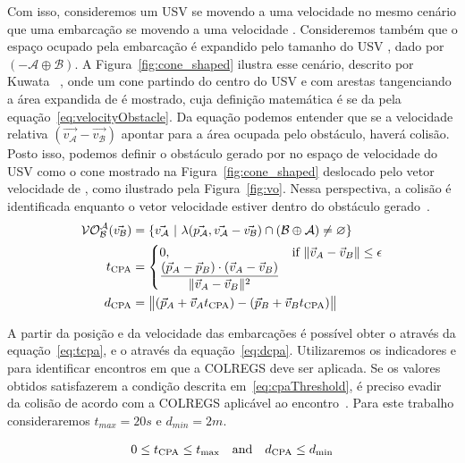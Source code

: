         Com isso, consideremos um USV \A se movendo a uma velocidade \va no mesmo cenário que uma embarcação \B se movendo a uma velocidade \vb. Consideremos também que o espaço ocupado pela embarcação \B é expandido pelo tamanho do USV \A, dado por $(-\mathcal{A} \oplus \mathcal{B})$. A Figura~\ref{fig:cone_shaped} ilustra esse cenário, descrito por Kuwata \etal~\cite{KUWATA2014110}, onde um cone partindo do centro do USV \A e com arestas tangenciando a área expandida de \B é mostrado, cuja definição matemática é se da pela equação~\eqref{eq:velocityObstacle}. Da equação podemos entender que se a velocidade relativa $(\vec{v_\mathcal{A}} - \vec{v_\mathcal{B}})$ apontar para a área ocupada pelo obstáculo, haverá colisão. Posto isso, podemos definir o obstáculo gerado por \B no espaço de velocidade do USV \A como o cone mostrado na Figura~\ref{fig:cone_shaped} deslocado pelo vetor velocidade de \vb, como ilustrado pela Figura~\ref{fig:vo}. Nessa perspectiva, a colisão é identificada enquanto o vetor velocidade \va estiver dentro do obstáculo gerado~\cite{KUWATA2014110}.
        \begin{align}
            \mathcal{VO^A_B}(\vec{v_\mathcal{B}}) &= \{\vec{v_\mathcal{A}}~|~\lambda(\vec{p_\mathcal{A}}, \vec{v_\mathcal{A}} - \vec{v_\mathcal{B}}) \cap (\mathcal{B} \oplus \mathcal{A}) \neq \varnothing\}\label{eq:velocityObstacle}\\
            t_{\rm CPA} &=
            \begin{cases}
                0, & \text{if } \Vert\vec{v}_{A}-\vec{v}_{B}\Vert\leq\epsilon\\
                \displaystyle{{(\vec{p}_{A}-\vec{p}_{B})\cdot(\vec{v}_{A}-\vec{v}_{B})}\over{\Vert\vec{v}_{A}-\vec{v}_{B}\Vert^{2}}}
            \end{cases}\label{eq:tcpa}\\
            d_{\rm CPA} &=\bigl\Vert (\vec{p}_{A}+\vec{v}_{A}t_{\rm CPA})-(\vec{p}_{B}+\vec{v}_{B}t_{\rm CPA})\bigr\Vert\label{eq:dcpa}
        \end{align}
        
        A partir da posição \pos e da velocidade \vel das embarcações é possível obter o \tcpa através da equação~\eqref{eq:tcpa}, e o \dcpa através da equação~\eqref{eq:dcpa}. Utilizaremos os indicadores \tcpa e \dcpa para identificar encontros em que a COLREGS deve ser aplicada. Se os valores obtidos satisfazerem a condição descrita em~\eqref{eq:cpaThreshold}, é preciso evadir da colisão de acordo com a COLREGS aplicável ao encontro~\cite{KUWATA2014110}. Para este trabalho consideraremos $t_{max} = 20s$ e $d_{min} = 2m$.
        
        \begin{equation}\label{eq:cpaThreshold}
            0\leq t_{\rm CPA}\leq t_{\max}\quad{\hbox {and}}\quad d_{\rm CPA}\leq d_{\min}
        \end{equation}